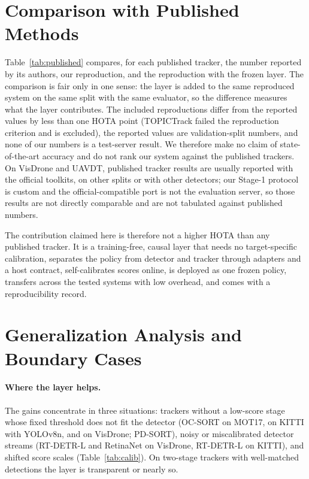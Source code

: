 \documentclass[pdflatex,sn-mathphys-num]{sn-jnl}
\begin{document}
\section{Comparison with Published Methods}\label{sec:published}
Table~\ref{tab:published} compares, for each published tracker, the number reported by its authors, our reproduction, and the reproduction with the frozen layer. The comparison is fair only in one sense: the layer is added to the same reproduced system on the same split with the same evaluator, so the difference measures what the layer contributes. The included reproductions differ from the reported values by less than one HOTA point (TOPICTrack failed the reproduction criterion and is excluded), the reported values are validation-split numbers, and none of our numbers is a test-server result. We therefore make no claim of state-of-the-art accuracy and do not rank our system against the published trackers. On VisDrone and UAVDT, published tracker results are usually reported with the official toolkits, on other splits or with other detectors; our Stage-1 protocol is custom and the official-compatible port is not the evaluation server, so those results are not directly comparable and are not tabulated against published numbers.



The contribution claimed here is therefore not a higher HOTA than any published tracker. It is a training-free, causal layer that needs no target-specific calibration, separates the policy from detector and tracker through adapters and a host contract, self-calibrates scores online, is deployed as one frozen policy, transfers across the tested systems with low overhead, and comes with a reproducibility record.

\section{Generalization Analysis and Boundary Cases}\label{sec:boundary}
\paragraph{Where the layer helps.} The gains concentrate in three situations: trackers without a low-score stage whose fixed threshold does not fit the detector (OC-SORT on MOT17, on KITTI with YOLOv8n, and on VisDrone; PD-SORT), noisy or miscalibrated detector streams (RT-DETR-L and RetinaNet on VisDrone, RT-DETR-L on KITTI), and shifted score scales (Table~\ref{tab:calib}). On two-stage trackers with well-matched detections the layer is transparent or nearly so.
\end{document}
